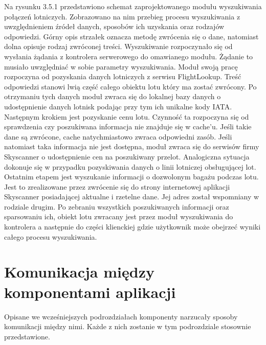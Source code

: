\documentclass[12pt, twoside]{report}
\begin{document}
Na rysunku 3.5.1 przedstawiono schemat zaprojektowanego modułu wyszukiwania połączeń lotniczych. Zobrazowano na nim przebieg procesu wyszukiwania z uwzględnieniem źródeł danych, sposobów ich uzyskania oraz rodzajów odpowiedzi. Górny opis strzałek oznacza metodę zwrócenia się o dane, natomiast dolna opisuje rodzaj zwróconej treści. Wyszukiwanie rozpoczynało się od wysłania żądania z kontrolera serwerowego do omawianego modułu. Żądanie to musiało uwzględniać w sobie parametry wyszukiwania. Moduł swoją pracę rozpoczyna od pozyskania danych lotniczych z serwisu FlightLookup. Treść odpowiedzi stanowi lwią część całego obiektu lotu który ma zostać zwrócony. Po otrzymaniu tych danych moduł zwraca się do lokalnej bazy danych o udostępnienie danych lotnisk podając przy tym ich unikalne kody IATA. Następnym krokiem jest pozyskanie cenu lotu. Czynność ta rozpoczyna się od sprawdzenia czy poszukiwana informacja nie znajduje się w cache'u. Jeśli takie dane są zwrócone, cache natychmiastowo zwraca odpowiedni zasób. Jeśli natomiast taka informacja nie jest dostępna, moduł zwraca się do serwisów firmy Skyscanner o udostępnienie cen na poszukiwany przelot. Analogiczna sytuacja dokonuje się w przypadku pozyskiwania danych o linii lotniczej obsługującej lot. Ostatnim etapem jest wyszukanie informacji o dozwolonym bagażu podczas lotu. Jest to zrealizowane przez zwrócenie się do strony internetowej aplikacji Skyscanner posiadającej aktualne i rzetelne dane. Jej adres został wspomniany w rodziale drugim. Po zebraniu wszystkich poszukiwanych informacji oraz sparsowaniu ich, obiekt lotu zwracany jest przez moduł wyszukiwania do kontrolera a następnie do części klienckiej gdzie użytkownik może obejrzeć wyniki całego procesu wyszukiwania.
\section{Komunikacja między komponentami aplikacji}
Opisane we wcześniejszych podrozdziałach komponenty narzucały sposoby komunikacji między nimi. Każde z nich zostanie w tym podrozdziale stosownie przedstawione. 
\end{document}

